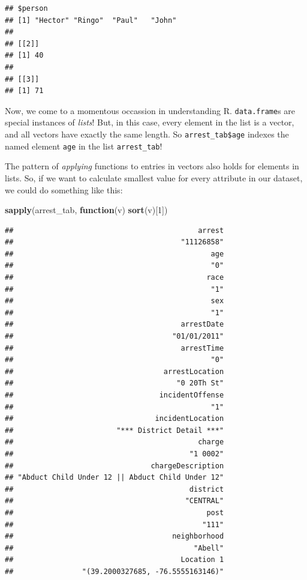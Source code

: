 \documentclass[12pt,]{book}
\newenvironment{Shaded}{\begin{snugshade}}{\end{snugshade}}
\newcommand{\KeywordTok}[1]{\textcolor[rgb]{0.13,0.29,0.53}{\textbf{#1}}}
\newcommand{\DecValTok}[1]{\textcolor[rgb]{0.00,0.00,0.81}{#1}}
\newcommand{\ControlFlowTok}[1]{\textcolor[rgb]{0.13,0.29,0.53}{\textbf{#1}}}
\newcommand{\NormalTok}[1]{#1}
\theoremstyle{definition}
\theoremstyle{definition}
\theoremstyle{remark}
\begin{document}
\begin{verbatim}
## $person
## [1] "Hector" "Ringo"  "Paul"   "John"  
## 
## [[2]]
## [1] 40
## 
## [[3]]
## [1] 71
\end{verbatim}

Now, we come to a momentous occassion in understanding R.
\texttt{data.frame}s are special instances of \emph{lists}! But, in this
case, every element in the list is a vector, and all vectors have
exactly the same length. So \texttt{arrest\_tab\$age} indexes the named
element \texttt{age} in the list \texttt{arrest\_tab}!

The pattern of \emph{applying} functions to entries in vectors also
holds for elements in lists. So, if we want to calculate smallest value
for every attribute in our dataset, we could do something like this:

\begin{Shaded}
\begin{Highlighting}[]
\KeywordTok{sapply}\NormalTok{(arrest_tab, }\ControlFlowTok{function}\NormalTok{(v) }\KeywordTok{sort}\NormalTok{(v)[}\DecValTok{1}\NormalTok{])}
\end{Highlighting}
\end{Shaded}

\begin{verbatim}
##                                           arrest 
##                                       "11126858" 
##                                              age 
##                                              "0" 
##                                             race 
##                                              "1" 
##                                              sex 
##                                              "1" 
##                                       arrestDate 
##                                     "01/01/2011" 
##                                       arrestTime 
##                                              "0" 
##                                   arrestLocation 
##                                      "0 20Th St" 
##                                  incidentOffense 
##                                              "1" 
##                                 incidentLocation 
##                        "*** District Detail ***" 
##                                           charge 
##                                         "1 0002" 
##                                chargeDescription 
## "Abduct Child Under 12 || Abduct Child Under 12" 
##                                         district 
##                                        "CENTRAL" 
##                                             post 
##                                            "111" 
##                                     neighborhood 
##                                          "Abell" 
##                                       Location 1 
##                "(39.2000327685, -76.5555163146)"
\end{verbatim}
\end{document}
